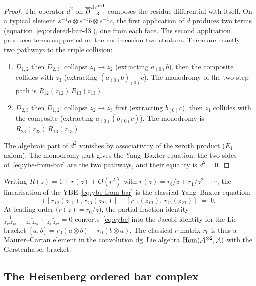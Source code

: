 \begin{proof}
The operator $d^2$ on ${\overline{B}^{\mathrm{ch}}}_3^{\mathrm{ord}}$ composes
the residue differential with itself. On a typical element
$s^{-1}a\otimes s^{-1}b\otimes s^{-1}c$, the first
application of $d$ produces two terms
(equation~\eqref{eq:ordered-bar-d3}), one from each face.
The second application produces terms supported on the
codimension-two stratum. There are exactly two pathways
to the triple collision:
\begin{enumerate}[label=(\roman*)]
\item $D_{1,2}$ then $D_{2,3}$: collapse $z_1\to z_2$
 (extracting $a_{(0)}b$), then the composite collides
 with $z_3$ (extracting $(a_{(0)}b)_{(0)}c$).
 The monodromy of the two-step path is
 $R_{12}(z_{12})\,R_{13}(z_{13})$.
\item $D_{2,3}$ then $D_{1,2}$: collapse $z_2\to z_3$
 first (extracting $b_{(0)}c$), then $z_1$ collides with
 the composite (extracting $a_{(0)}(b_{(0)}c)$).
 The monodromy is
 $R_{23}(z_{23})\,R_{13}(z_{13})$.
\end{enumerate}
The algebraic part of $d^2$ vanishes by associativity of
the zeroth product ($E_1$ axiom). The monodromy part
gives the Yang--Baxter equation: the two sides
of~\eqref{eq:ybe-from-bar} are the two pathways, and their
equality is $d^2=0$.
\end{proof}

\begin{corollary}
Writing $R(z)=1+r(z)+O(r^2)$ with
$r(z)=r_0/z+r_1/z^2+\cdots$, the linearisation of
the YBE~\eqref{eq:ybe-from-bar} is the classical
Yang--Baxter equation:
\begin{equation}%
[r_{12}(z_{12}),\,r_{13}(z_{13})]
+[r_{12}(z_{12}),\,r_{23}(z_{23})]
+[r_{13}(z_{13}),\,r_{23}(z_{23})]
\;=\;0.
\end{equation}
At leading order ($r(z)=r_0/z$), the partial-fraction
identity
$\tfrac{1}{z_{12}z_{13}}+\tfrac{1}{z_{21}z_{23}}
+\tfrac{1}{z_{31}z_{32}}=0$
converts~\eqref{eq:cybe} into the Jacobi identity for the
Lie bracket $[a,b]=r_0(a\otimes b)-r_0(b\otimes a)$. The
classical $r$-matrix $r_0$ is thus a Maurer--Cartan element
in the convolution dg~Lie algebra
$\operatorname{Hom}(\bar{\mathcal{A}}^{\otimes 2},\bar{\mathcal{A}})$ with the
Gerstenhaber bracket.
\end{corollary}

\subsection{The Heisenberg ordered bar complex}

